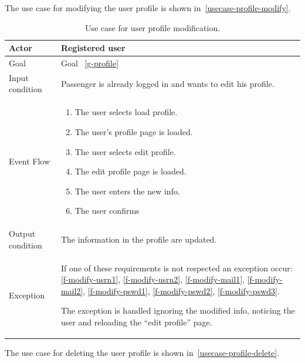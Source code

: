 The use case for modifying the user profile is shown in~\autoref{usecase-profile-modify}.

\begin{table}
\begin{center}
\begin{tabular}{| l | p{} |}
\hline
Actor & Registered user \\
\hline
Goal & Goal ~\ref{g-profile}
\\
\hline
Input condition & Passenger is already logged in and wants to edit his profile.  \\
\hline
Event Flow & \begin{enumerate}
	\item The user selects load profile.
	\item The user's profile page is loaded.
	\item The user selects edit profile.
	\item The edit profile page is loaded.
	\item The user enters the new info.
	\item The user confirms
	\end{enumerate}
\\
\hline
Output condition & The information in the profile are updated. \\
\hline

Exception & If one of these requirements is not respected an exception occur:
\ref{f-modify-usrn1},
\ref{f-modify-usrn2},
\ref{f-modify-mail1},
\ref{f-modify-mail2},
\ref{f-modify-pswd1},
\ref{f-modify-pswd2},
\ref{f-modify-pswd3}.

The exception is handled ignoring the modified info, noticing the user and reloading the ``edit profile'' page. \\
\hline
\end{tabular}
\end{center}
\caption{Use case for user profile modification.}
\label{usecase-profile-modify}
\end{table}


The use case for deleting the user profile is shown in~\autoref{usecase-profile-delete}.

